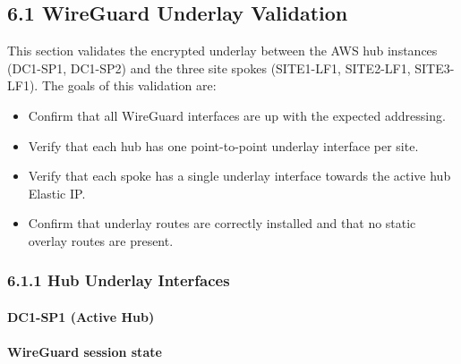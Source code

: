 \documentclass[11pt]{article}
\begin{document}
\subsection{6.1 WireGuard Underlay Validation}
\label{sec:wg-underlay-validation}

This section validates the encrypted underlay between the AWS hub instances (DC1-SP1, DC1-SP2) and the three site spokes (SITE1-LF1, SITE2-LF1, SITE3-LF1). The goals of this validation are:

\begin{itemize}
  \item Confirm that all WireGuard interfaces are up with the expected addressing.
  \item Verify that each hub has one point-to-point underlay interface per site.
  \item Verify that each spoke has a single underlay interface towards the active hub Elastic IP.
  \item Confirm that underlay routes are correctly installed and that no static overlay routes are present.
\end{itemize}

%
%
%
\subsubsection{6.1.1 Hub Underlay Interfaces}
\label{sec:hub-underlay-interfaces}

\paragraph{DC1-SP1 (Active Hub)}

\paragraph{WireGuard session state}
\end{document}
